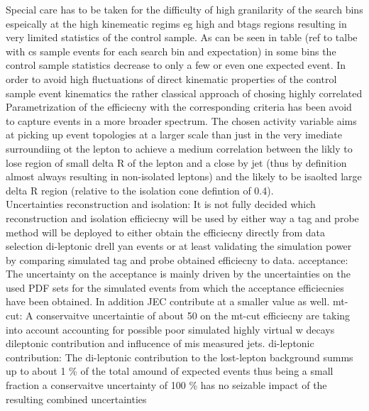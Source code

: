 \documentclass{beamer}
\begin{document}
\begin{frame}
 Special care has to be taken for the difficulty of high granilarity of the search bins espeically at the high kinemeatic regims eg high \NJets and btags regions resulting in very limited statistics of the control sample. As can be seen in table (ref to talbe with cs sample events for each search bin and expectation) in some bins the control sample statistics decrease to only a few or even one expected event. In order to avoid high fluctuations of direct kinematic properties of the control sample event kinematics the rather classical approach of chosing highly correlated Parametrization of the efficiecny with the corresponding criteria has been avoid to capture events in a more broader spectrum. 
 The chosen activity variable aims at picking up event topologies at a larger scale than just in the very imediate surroundiing ot the lepton to achieve a medium correlation between the likly to lose region of small delta R of the lepton and a close by jet (thus by definition almost always resulting in non-isolated leptons) and the likely to be isaolted large delta R region (relative to the isolation cone defintion of 0.4).  \\
 
 Uncertainties
 reconstruction and isolation: It is not fully decided which reconstruction and isolation efficiecny will be used by either way a tag and probe method will be deployed to either obtain the efficiecny directly from data selection di-leptonic drell yan events or at least validating the simulation power by comparing simulated tag and probe obtained efficiecny to data. 
 acceptance: The uncertainty on the acceptance is mainly driven by the uncertainties on the used PDF sets for the simulated events from which the acceptance efficiecnies have been obtained. In addition JEC contribute at a smaller value as well.
 mt-cut: A conservaitve uncertaintie of about 50 on the mt-cut efficiecny are taking into account accounting for possible poor simulated highly virtual w decays dileptonic contribution and influcence of mis measured jets.
 di-leptonic contribution: The di-leptonic contribution to the lost-lepton background summs up to about 1 \% of the total amound of expected events thus being a small fraction a conservaitve uncertainty of 100 \% has no seizable impact of the resulting combined uncertainties
 
\end{frame}



\setcounter{framenumber}{19}
\end{document}
